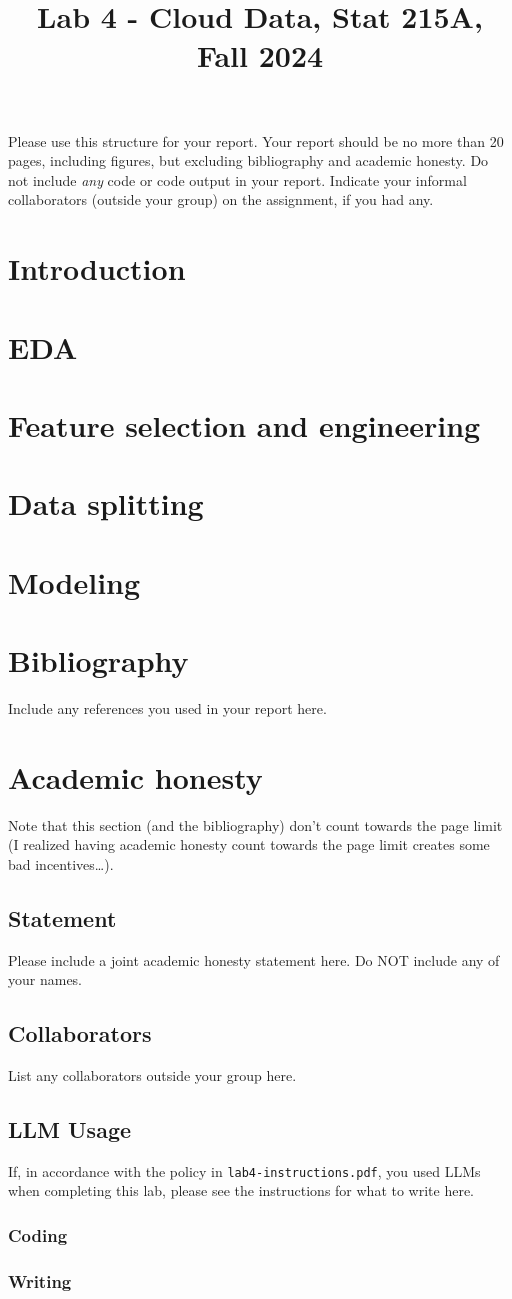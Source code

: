 \documentclass[10pt,letterpaper]{article}
\title{Lab 4 - Cloud Data, Stat 215A, Fall 2024\vspace{-2em}}
\begin{document}
\maketitle

Please use this structure for your report. Your report should be no more than 20 pages, including figures, but excluding bibliography and academic honesty. Do not include \emph{any} code or code output in your report. Indicate your informal collaborators (outside your group) on the assignment, if you had any.

\section{Introduction}

\section{EDA}

\section{Feature selection and engineering}

\section{Data splitting}

\section{Modeling}

\section{Bibliography}
Include any references you used in your report here.
\appendix
\section{Academic honesty}
Note that this section (and the bibliography) don't count towards the page limit (I realized having academic honesty count towards the page limit creates some bad incentives\ldots).
\subsection{Statement}
Please include a joint academic honesty statement here. Do NOT include any of your names.
\subsection{Collaborators}
List any collaborators outside your group here.
\subsection{LLM Usage}
If, in accordance with the policy in \texttt{lab4-instructions.pdf}, you used LLMs when completing this lab, please see the instructions for what to write here.

\subsubsection*{Coding}

\subsubsection*{Writing}
\end{document}
